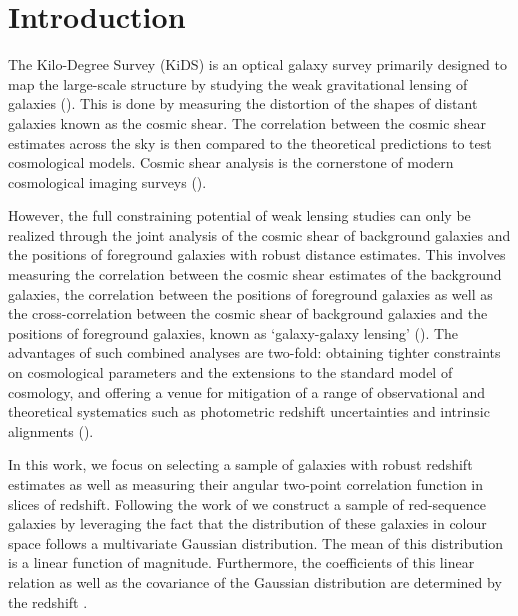 \documentclass{aa}
\numberwithin{equation}{section}
\begin{document}

\maketitle


\section{Introduction}

The Kilo-Degree Survey (KiDS) is an optical galaxy survey primarily designed to map the large-scale structure by studying the weak gravitational lensing of galaxies (\citealt{kuijken2015, hendrick2017, giblin2020, hendrik2020}). This is done by measuring the distortion of the shapes of distant galaxies known as the cosmic shear. The correlation between the cosmic shear estimates across the sky is then compared to the theoretical predictions to test cosmological models. Cosmic shear analysis is the cornerstone of modern cosmological imaging surveys (\citealt{heymans2013,jee2016,hendrick2017,joudaki2017,troxel2017,joudaki2019, hikage2019}). 

However, the full constraining potential of weak lensing studies can only be realized through the joint analysis of the cosmic shear of background galaxies and the positions of foreground galaxies with robust distance estimates. This involves measuring the correlation between the cosmic shear estimates of the background galaxies, the correlation between the positions of foreground galaxies as well as the cross-correlation between the cosmic shear of background galaxies and the positions of foreground galaxies, known as `galaxy-galaxy lensing' (\citealt{cacciato2013, cosmolike, des_y1_cosmology, elvin2017, edo2018, prat2017}). 
The advantages of such combined analyses are two-fold: obtaining tighter constraints on cosmological parameters and the extensions to the standard model of cosmology, and offering a venue for mitigation of a range of observational and theoretical systematics such as photometric redshift uncertainties and intrinsic alignments (\citealt{edo2016, joudaki2018, sam2019}). 

In this work, we focus on selecting a sample of galaxies with robust redshift estimates as well as measuring their angular two-point correlation function in slices of redshift. Following the work of \citet{vakili2019} we construct a sample of red-sequence galaxies by leveraging the fact that the distribution of these galaxies in colour space follows a multivariate Gaussian distribution. The mean of this distribution is a linear function of magnitude. Furthermore, the coefficients of this linear relation as well as the covariance of the Gaussian distribution are determined by the redshift \citep[e.g.][]{bower1992,ellis1997,gladders1998,stanford1998}. 
\end{document}
